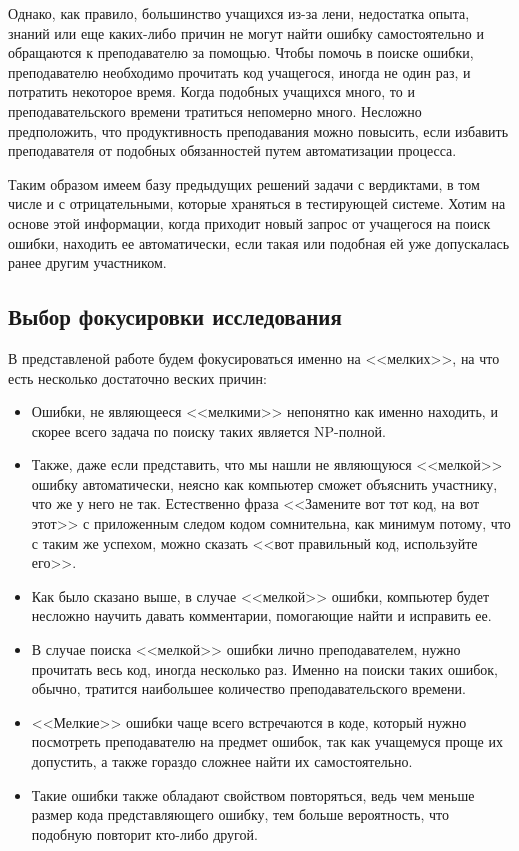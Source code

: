 Однако, как правило, большинство учащихся из-за лени, недостатка опыта, знаний или еще каких-либо причин не могут найти ошибку
самостоятельно и обращаются к преподавателю за помощью. Чтобы помочь в поиске ошибки, преподавателю необходимо прочитать код учащегося,
иногда не один раз, и потратить некоторое время. Когда подобных учащихся много, то и преподавательского времени тратиться 
непомерно много. Несложно предположить, что продуктивность преподавания можно повысить, если избавить преподавателя от 
подобных обязанностей путем автоматизации процесса.

Таким образом имеем базу предыдущих решений задачи с вердиктами, в том числе и с отрицательными, которые храняться в 
тестирующей системе. Хотим на основе этой информации, когда приходит новый запрос от учащегося на поиск ошибки, 
находить ее автоматически, если такая или подобная ей уже допускалась ранее другим участником. 

\subsection{Выбор фокусировки исследования}
В представленой работе будем фокусироваться именно на <<мелких>>, на что есть несколько достаточно веских причин:
\begin{itemize}
    \item Ошибки, не являющееся <<мелкими>> непонятно как именно находить, и скорее всего задача по поиску таких
        является NP-полной.
    \item Также, даже если представить, что мы нашли не являющуюся <<мелкой>> ошибку автоматически, неясно как
        компьютер сможет объяснить участнику, что же у него не так. Естественно фраза <<Замените вот тот код, на вот этот>>
        с приложенным следом кодом сомнительна, как минимум потому, что с таким же успехом, можно сказать <<вот правильный
        код, используйте его>>.
    \item Как было сказано выше, в случае <<мелкой>> ошибки, компьютер будет несложно научить давать комментарии, помогающие
        найти и исправить ее. 
    \item В случае поиска <<мелкой>> ошибки лично преподавателем, нужно прочитать
        весь код, иногда несколько раз. Именно на поиски таких ошибок, обычно, тратится наибольшее количество
        преподавательского времени.
    \item <<Мелкие>> ошибки чаще всего встречаются в коде, который нужно посмотреть преподавателю на предмет ошибок, 
        так как учащемуся проще их допустить, а также гораздо сложнее найти их самостоятельно.
    \item Такие ошибки также обладают свойством повторяться, ведь чем меньше размер кода представляющего ошибку, 
        тем больше вероятность, что подобную повторит кто-либо другой.
\end{itemize}


